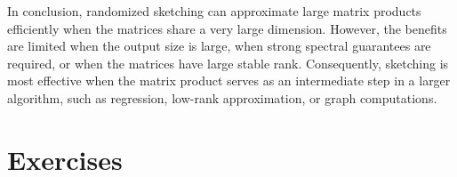 \smallskip
In conclusion, randomized sketching can approximate large matrix products efficiently when the matrices share a very large dimension. However, the benefits are limited when the output size is large, when strong spectral guarantees are required, or when the matrices have large stable rank. Consequently, sketching is most effective when the matrix product serves as an intermediate step in a larger algorithm, such as regression, low-rank approximation, or graph computations.





\section*{Exercises}

